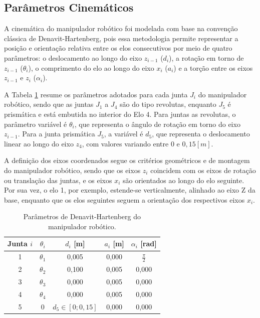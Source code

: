\subsection{Parâmetros Cinemáticos}

A cinemática do manipulador robótico foi modelada com base na convenção clássica de Denavit-Hartenberg, pois essa metodologia permite representar a posição e orientação relativa entre os elos consecutivos por meio de quatro parâmetros:
o deslocamento ao longo do eixo $z_{i-1}$ ($d_i$),
a rotação em torno de $z_{i-1}$ ($\theta_i$),
o comprimento do elo ao longo do eixo $x_i$ ($a_i$) e
a torção entre os eixos $z_{i-1}$ e $z_i$ ($\alpha_i$).

A Tabela \ref{tab:DH_parametros} resume os parâmetros adotados para cada junta $J_i$ do manipulador robótico, sendo que as juntas $J_1$ a $J_4$ são do tipo revolutas, enquanto $J_5$ é prismática e está embutida no interior do Elo 4. Para juntas as revolutas, o parâmetro variável é $\theta_i$, que representa o ângulo de rotação em torno do eixo $z_{i-1}$. Para a junta prismática $J_5$, a variável é $d_5$, que representa o deslocamento linear ao longo do eixo $z_4$, com valores variando entre $0$ e $0{,}15[m]$.

A definição dos eixos coordenados segue os critérios geométricos e de montagem do manipulador robótico, sendo que os eixos $z_i$ coincidem com os eixos de rotação ou translação das juntas, e os eixos $x_i$ são orientados ao longo do elo seguinte.
Por sua vez, o elo 1, por exemplo, estende-se verticalmente, alinhado ao eixo Z da base, enquanto que os elos seguintes seguem a orientação dos respectivos eixos $x_i$.

\begin{table}[ht]
\centering
\caption{Parâmetros de Denavit-Hartenberg do manipulador robótico.}
\label{tab:DH_parametros}
\begin{tabular}{ccccc}
\toprule
Junta $i$ & $\theta_i$ & $d_i$ [m] & $a_i$ [m] & $\alpha_i$ [rad] \\
\midrule
1 & $\theta_1$ & 0{,}005        & 0{,}000  & $\frac{\pi}{2}$ \\ [4pt]
2 & $\theta_2$ & 0{,}100        & 0{,}005  & 0{,}000         \\ [4pt]
3 & $\theta_3$ & 0{,}000        & 0{,}005  & 0{,}000         \\ [4pt]
4 & $\theta_4$ & 0{,}000        & 0{,}005  & 0{,}000         \\ [4pt]
5 & 0          & $d_5 \in [0; 0,15]$ & 0{,}000  & 0{,}000       \\ [4pt]
\bottomrule
\end{tabular}
\end{table}
